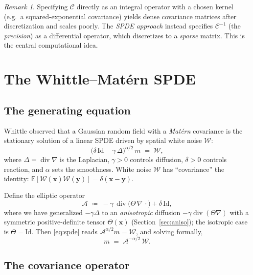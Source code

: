 \documentclass[11pt]{article}
\theoremstyle{definition}
\theoremstyle{plain}
\theoremstyle{remark}
\newtheorem{remark}{Remark}[section]
\newcommand{\E}{\mathbb{E}}
\newcommand{\divg}{\operatorname{div}}
\newcommand{\grad}{\nabla}
\newcommand{\Cc}{\mathcal{C}}
\newcommand{\Ac}{\mathcal{A}}
\newcommand{\Wc}{\mathcal{W}}
\newcommand{\bx}{\bm{x}}
\newcommand{\by}{\bm{y}}
\begin{document}
\begin{remark}
Specifying $\Cc$ directly as an integral operator with a chosen kernel
(e.g.\ a squared-exponential covariance) yields dense covariance matrices
after discretization and scales poorly. The \emph{SPDE approach} instead
specifies $\Cc^{-1}$ (the \emph{precision}) as a differential operator, which
discretizes to a \emph{sparse} matrix. This is the central computational idea.
\end{remark}

\section{The Whittle--Mat\'ern SPDE}

\subsection{The generating equation}

Whittle observed that a Gaussian random field with a \emph{Mat\'ern} covariance
is the stationary solution of a linear SPDE driven by spatial white noise
$\Wc$:
\begin{equation}
  \bigl(\delta \,\mathrm{Id} - \gamma\,\Delta\bigr)^{\alpha/2}\, m
     \;=\; \Wc,
  \label{eq:spde}
\end{equation}
where $\Delta = \divg\grad$ is the Laplacian, $\gamma>0$ controls diffusion,
$\delta>0$ controls reaction, and $\alpha$ sets the smoothness. White noise
$\Wc$ has ``covariance'' the identity: $\E[\Wc(\bx)\Wc(\by)] = \delta(\bx-\by)$.

Define the elliptic operator
\begin{equation}
  \Ac \;\coloneqq\; -\gamma\,\divg\!\bigl(\Theta\,\grad\,\cdot\bigr)
                    + \delta\,\mathrm{Id},
  \label{eq:Aoperator}
\end{equation}
where we have generalized $-\gamma\Delta$ to an \emph{anisotropic} diffusion
$-\gamma\divg(\Theta\grad)$ with a symmetric positive-definite tensor
$\Theta(\bx)$ (Section~\ref{sec:aniso}); the isotropic case is $\Theta = \mathrm{Id}$.
Then \eqref{eq:spde} reads $\Ac^{\alpha/2} m = \Wc$, and solving formally,
\begin{equation}
  m \;=\; \Ac^{-\alpha/2}\,\Wc.
  \label{eq:msolve}
\end{equation}

\subsection{The covariance operator}
\end{document}
